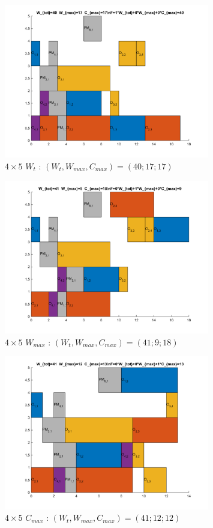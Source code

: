 \documentclass[10pt,a4paper]{scrartcl}
\begin{document}
\begin{figure}
  \centering
  \includegraphics[width=0.8\textwidth]{img/results4x5_Wtot.png}
  \caption{$4 \times 5$ $W_{t}$ : $(W_t, W_{max}, C_{max}) = (40; 17; 17)$}
\end{figure}
\begin{figure}
  \centering
  \includegraphics[width=0.8\textwidth]{img/results4x5_Wmax.png}
  \caption{$4 \times 5$ $W_{max}$ : $(W_t, W_{max}, C_{max}) = (41; 9; 18)$}
\end{figure}
\begin{figure}
  \centering
  \includegraphics[width=0.8\textwidth]{img/results4x5_Cmax.png}
  \caption{$4 \times 5$ $C_{max}$ : $(W_t, W_{max}, C_{max}) = (41; 12; 12)$}
\end{figure}
\end{document}
